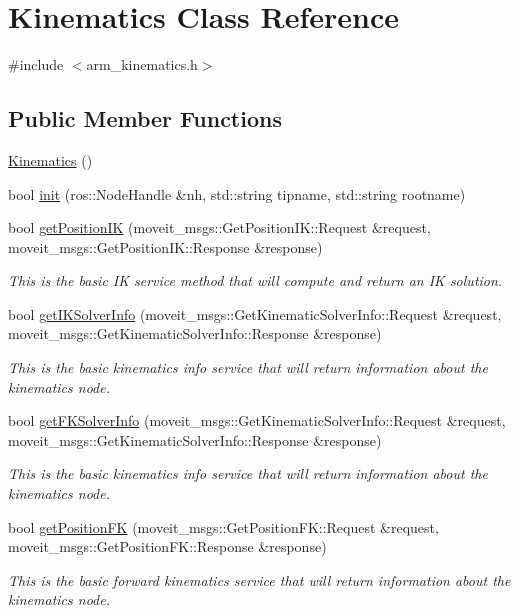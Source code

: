 \hypertarget{classKinematics}{\section{Kinematics Class Reference}
\label{classKinematics}
}


{\ttfamily \#include $<$arm\-\_\-kinematics.\-h$>$}

\subsection*{Public Member Functions}
\begin{DoxyCompactItemize}
\item 
\hyperlink{classKinematics_af4e587252019eaa863b4246026296d4a}{Kinematics} ()
\item 
bool \hyperlink{classKinematics_adb7f126d671ba5fd9b07e999bc31c6b6}{init} (ros\-::\-Node\-Handle \&nh, std\-::string tipname, std\-::string rootname)
\item 
bool \hyperlink{classKinematics_a7dd98191224874c90c61870afe626557}{get\-Position\-I\-K} (moveit\-\_\-msgs\-::\-Get\-Position\-I\-K\-::\-Request \&request, moveit\-\_\-msgs\-::\-Get\-Position\-I\-K\-::\-Response \&response)
\begin{DoxyCompactList}\small\item\em This is the basic I\-K service method that will compute and return an I\-K solution. \end{DoxyCompactList}\item 
bool \hyperlink{classKinematics_a98e971f7084d97de2747d8ab4c337a14}{get\-I\-K\-Solver\-Info} (moveit\-\_\-msgs\-::\-Get\-Kinematic\-Solver\-Info\-::\-Request \&request, moveit\-\_\-msgs\-::\-Get\-Kinematic\-Solver\-Info\-::\-Response \&response)
\begin{DoxyCompactList}\small\item\em This is the basic kinematics info service that will return information about the kinematics node. \end{DoxyCompactList}\item 
bool \hyperlink{classKinematics_a2901a1b230c4b0cc59c8099c8bf485bd}{get\-F\-K\-Solver\-Info} (moveit\-\_\-msgs\-::\-Get\-Kinematic\-Solver\-Info\-::\-Request \&request, moveit\-\_\-msgs\-::\-Get\-Kinematic\-Solver\-Info\-::\-Response \&response)
\begin{DoxyCompactList}\small\item\em This is the basic kinematics info service that will return information about the kinematics node. \end{DoxyCompactList}\item 
bool \hyperlink{classKinematics_af444e591ca2efd584aee96d494ae8017}{get\-Position\-F\-K} (moveit\-\_\-msgs\-::\-Get\-Position\-F\-K\-::\-Request \&request, moveit\-\_\-msgs\-::\-Get\-Position\-F\-K\-::\-Response \&response)
\begin{DoxyCompactList}\small\item\em This is the basic forward kinematics service that will return information about the kinematics node. \end{DoxyCompactList}\end{DoxyCompactItemize}
